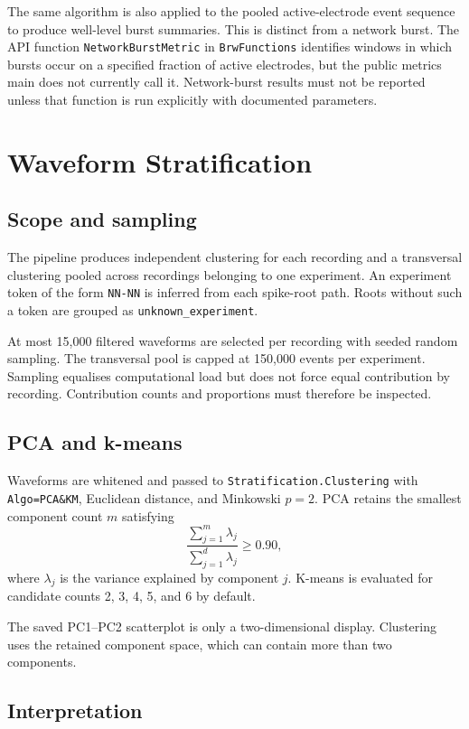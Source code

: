 \documentclass[11pt,a4paper]{article}
\newcommand{\code}[1]{\texttt{#1}}
\begin{document}
The same algorithm is also applied to the pooled active-electrode event sequence
to produce well-level burst summaries. This is distinct from a network burst.
The API function \code{NetworkBurstMetric} in \code{BrwFunctions} identifies windows in
which bursts occur on a specified fraction of active electrodes, but the public
metrics main does not currently call it. Network-burst results must not be
reported unless that function is run explicitly with documented parameters.

\section{Waveform Stratification}

\subsection{Scope and sampling}

The pipeline produces independent clustering for each recording and a
transversal clustering pooled across recordings belonging to one experiment.
An experiment token of the form \code{NN-NN} is inferred from each spike-root
path. Roots without such a token are grouped as \code{unknown\_experiment}.

At most 15,000 filtered waveforms are selected per recording with seeded random
sampling. The transversal pool is capped at 150,000 events per experiment.
Sampling equalises computational load but does not force equal contribution by
recording. Contribution counts and proportions must therefore be inspected.

\subsection{PCA and k-means}

Waveforms are whitened and passed to \code{Stratification.Clustering} with
\code{Algo=PCA\&KM}, Euclidean distance, and Minkowski \(p=2\). PCA retains the
smallest component count \(m\) satisfying
\[
  \frac{\sum_{j=1}^{m}\lambda_j}{\sum_{j=1}^{d}\lambda_j} \geq 0.90,
\]
where \(\lambda_j\) is the variance explained by component \(j\). K-means is
evaluated for candidate counts 2, 3, 4, 5, and 6 by default.

The saved PC1--PC2 scatterplot is only a two-dimensional display. Clustering
uses the retained component space, which can contain more than two components.

\subsection{Interpretation}
\end{document}
